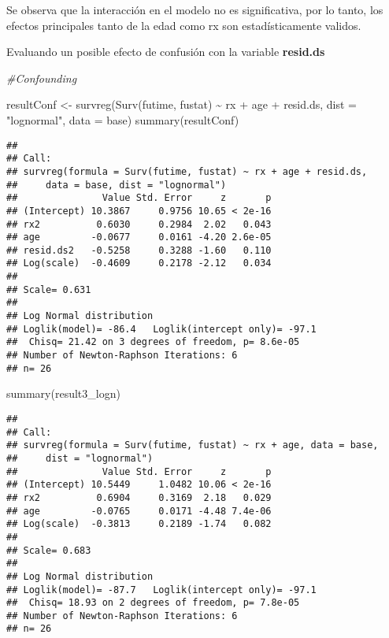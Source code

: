 \documentclass[
]{article}
\newenvironment{Shaded}{\begin{snugshade}}{\end{snugshade}}
\newcommand{\AttributeTok}[1]{\textcolor[rgb]{0.77,0.63,0.00}{#1}}
\newcommand{\CommentTok}[1]{\textcolor[rgb]{0.56,0.35,0.01}{\textit{#1}}}
\newcommand{\FunctionTok}[1]{\textcolor[rgb]{0.00,0.00,0.00}{#1}}
\newcommand{\NormalTok}[1]{#1}
\newcommand{\OtherTok}[1]{\textcolor[rgb]{0.56,0.35,0.01}{#1}}
\newcommand{\SpecialCharTok}[1]{\textcolor[rgb]{0.00,0.00,0.00}{#1}}
\newcommand{\StringTok}[1]{\textcolor[rgb]{0.31,0.60,0.02}{#1}}
\begin{document}
Se observa que la interacción en el modelo no es significativa, por lo
tanto, los efectos principales tanto de la edad como rx son
estadísticamente validos.

Evaluando un posible efecto de confusión con la variable
\textbf{resid.ds}

\begin{Shaded}
\begin{Highlighting}[]
\CommentTok{\#Confounding}

\NormalTok{resultConf }\OtherTok{\textless{}{-}} \FunctionTok{survreg}\NormalTok{(}\FunctionTok{Surv}\NormalTok{(futime, fustat) }\SpecialCharTok{\textasciitilde{}}\NormalTok{ rx }\SpecialCharTok{+}\NormalTok{ age }\SpecialCharTok{+}\NormalTok{ resid.ds, }\AttributeTok{dist =} \StringTok{"lognormal"}\NormalTok{, }\AttributeTok{data =}\NormalTok{ base)}
\FunctionTok{summary}\NormalTok{(resultConf)}
\end{Highlighting}
\end{Shaded}

\begin{verbatim}
## 
## Call:
## survreg(formula = Surv(futime, fustat) ~ rx + age + resid.ds, 
##     data = base, dist = "lognormal")
##               Value Std. Error     z       p
## (Intercept) 10.3867     0.9756 10.65 < 2e-16
## rx2          0.6030     0.2984  2.02   0.043
## age         -0.0677     0.0161 -4.20 2.6e-05
## resid.ds2   -0.5258     0.3288 -1.60   0.110
## Log(scale)  -0.4609     0.2178 -2.12   0.034
## 
## Scale= 0.631 
## 
## Log Normal distribution
## Loglik(model)= -86.4   Loglik(intercept only)= -97.1
##  Chisq= 21.42 on 3 degrees of freedom, p= 8.6e-05 
## Number of Newton-Raphson Iterations: 6 
## n= 26
\end{verbatim}

\begin{Shaded}
\begin{Highlighting}[]
\FunctionTok{summary}\NormalTok{(result3\_logn)}
\end{Highlighting}
\end{Shaded}

\begin{verbatim}
## 
## Call:
## survreg(formula = Surv(futime, fustat) ~ rx + age, data = base, 
##     dist = "lognormal")
##               Value Std. Error     z       p
## (Intercept) 10.5449     1.0482 10.06 < 2e-16
## rx2          0.6904     0.3169  2.18   0.029
## age         -0.0765     0.0171 -4.48 7.4e-06
## Log(scale)  -0.3813     0.2189 -1.74   0.082
## 
## Scale= 0.683 
## 
## Log Normal distribution
## Loglik(model)= -87.7   Loglik(intercept only)= -97.1
##  Chisq= 18.93 on 2 degrees of freedom, p= 7.8e-05 
## Number of Newton-Raphson Iterations: 6 
## n= 26
\end{verbatim}
\end{document}
